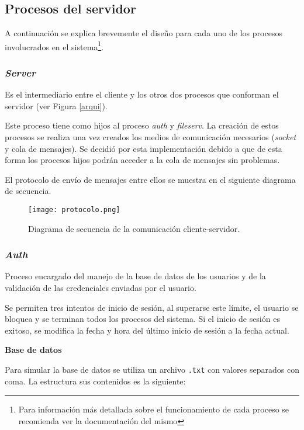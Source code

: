 \documentclass[12pt,a4paper]{article}
\begin{document}
\newpage

\subsection{Procesos del servidor}
\label{server}

A continuación se explica brevemente el diseño para cada uno de los
procesos involucrados en el sistema\footnote{Para información más
detallada sobre el funcionamiento de cada proceso se recomienda ver
la documentación del mismo}.

\subsubsection{\emph{Server}}
\label{server_ps}
Es el intermediario entre el cliente y los otros dos procesos que
conforman el servidor (ver Figura \ref{arqui}).

Este proceso tiene como hijos al proceso \emph{auth} y \emph{fileserv}.
La creación de estos procesos se realiza una vez creados los medios
de comunicación necesarios (\emph{socket} y cola de mensajes). Se
decidió por esta implementación debido a que de esta forma los
procesos hijos podrán acceder a la cola de mensajes sin problemas.

El protocolo de envío de mensajes entre ellos se muestra en el
siguiente diagrama de secuencia.

\begin{figure}[H]
  \center
  \texttt{[image: protocolo.png]}
  \caption{Diagrama de secuencia de la comunicación cliente-servidor.}
  \label{com_seq}
\end{figure}

\subsubsection{\emph{Auth}}
\label{auth_ps}
Proceso encargado del manejo de la base de datos de los usuarios y
de la validación de las credenciales enviadas por el usuario.

Se permiten tres intentos de inicio de sesión, al superarse este
límite, el usuario se bloquea y se terminan todos los procesos del
sistema. Si el inicio de sesión es exitoso, se modifica la fecha
y hora del último inicio de sesión a la fecha actual.

\textbf{Base de datos}

Para simular la base de datos se utiliza un archivo \verb|.txt| con
valores separados con coma. La estructura sus contenidos es la
siguiente:
\end{document}
